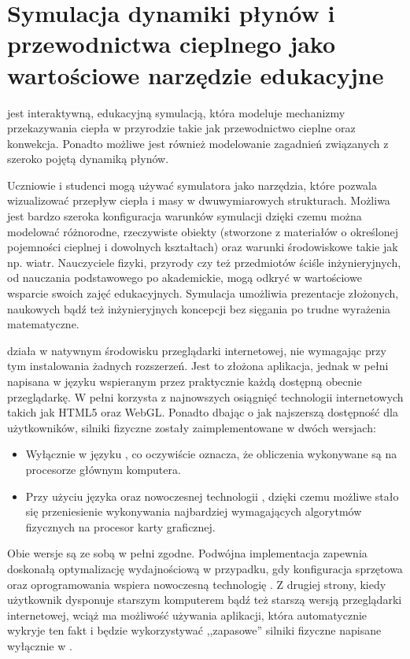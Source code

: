 \chapter{Symulacja dynamiki płynów i przewodnictwa cieplnego jako wartościowe narzędzie edukacyjne}
\label{cha:mozliwosci}

\en jest interaktywną, edukacyjną symulacją, która modeluje mechanizmy
przekazywania ciepła w przyrodzie takie jak przewodnictwo cieplne oraz
konwekcja. Ponadto możliwe jest również modelowanie zagadnień związanych z
szeroko pojętą dynamiką płynów.

Uczniowie i studenci mogą używać symulatora \en jako narzędzia, które pozwala
wizualizować przepływ ciepła i masy w dwuwymiarowych strukturach. Możliwa jest
bardzo szeroka konfiguracja warunków symulacji dzięki czemu można modelować
różnorodne, rzeczywiste obiekty (stworzone z materiałów o określonej pojemności
cieplnej i dowolnych kształtach) oraz warunki środowiskowe takie jak np. wiatr.
Nauczyciele fizyki, przyrody czy też przedmiotów ściśle inżynieryjnych, od
nauczania podstawowego po akademickie, mogą odkryć w \en wartościowe wsparcie
swoich zajęć edukacyjnych. Symulacja umożliwia prezentacje złożonych, naukowych
bądź też inżynieryjnych koncepcji bez sięgania po trudne wyrażenia matematyczne.

\en działa w natywnym środowisku przeglądarki internetowej, nie wymagając przy
tym instalowania żadnych rozszerzeń. Jest to złożona aplikacja, jednak w pełni
napisana w języku \js wspieranym przez praktycznie każdą dostępną obecnie
przeglądarkę. W pełni korzysta z najnowszych osiągnięć technologii internetowych
takich jak HTML5 oraz WebGL. Ponadto dbając o jak najszerszą dostępność dla
użytkowników, silniki fizyczne zostały zaimplementowane w dwóch wersjach:

\begin{itemize} 

\item Wyłącznie w języku \js, co oczywiście oznacza, że obliczenia wykonywane są
na procesorze głównym komputera.

\item Przy użyciu języka \js oraz nowoczesnej technologii , dzięki
czemu możliwe stało się przeniesienie wykonywania najbardziej wymagających
algorytmów fizycznych na procesor karty graficznej.

\end{itemize}

Obie wersje są ze sobą w pełni zgodne. Podwójna implementacja zapewnia doskonałą
optymalizację wydajnościową w przypadku, gdy konfiguracja sprzętowa oraz
oprogramowania wspiera nowoczesną technologię . Z drugiej strony,
kiedy użytkownik dysponuje starszym komputerem bądź też starszą wersją
przeglądarki internetowej, wciąż ma możliwość używania aplikacji, która
automatycznie wykryje ten fakt i będzie wykorzystywać ,,zapasowe'' silniki
fizyczne napisane wyłącznie w \js.

